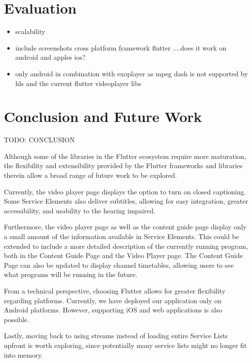 \documentclass[conference]{IEEEtran}
\begin{document}
\section{Evaluation}




\begin{itemize}
	\item scalability
	\item include screenshots cross platform framework flutter ....does it work on android and apples ios?
	\item only android in combination with exoplayer as mpeg dash is not supported by hls and the current flutter videoplayer libs
\end{itemize}



\section{Conclusion and Future Work}
TODO: CONCLUSION

Although some of the libraries in the Flutter ecosystem require more maturation, the flexibility and extensibility provided by the Flutter frameworks and libraries therein allow a broad range of future work to be explored. \\\par
Currently, the video player page displays the option to turn on closed captioning. Some Service Elements also deliver subtitles, allowing for easy integration,  greater accessibility, and usability to the hearing impaired. \\\par
Furthermore, the video player page as well as the content guide page display only a small amount of the information available in Service Elements. This could be extended to include a more detailed description of the currently running program, both in the Content Guide Page and the Video Player page.
The Content Guide Page can also be updated to display channel timetables, allowing users to see what programs will be running in the future.
\\\par
From a technical perspective, choosing Flutter allows for greater flexibility regarding platforms. Currently, we have deployed our application only on Android platforms. However, supporting iOS and web applications is also possible. \\\par
Lastly, moving back to using streams instead of loading entire Service Lists upfront is worth exploring, since potentially many service lists might no longer fit into memory.
\end{document}
